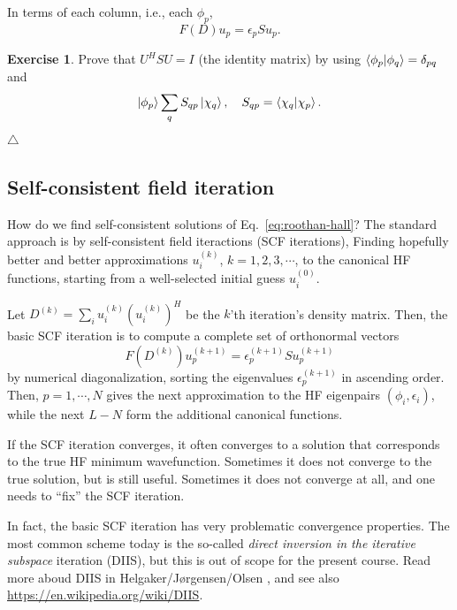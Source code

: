 \documentclass{report}
\theoremstyle{plain}
\theoremstyle{definition}
\newtheorem{exerc}{Exercise}[chapter]
\newcommand\xqed[1]{%
  \leavevmode\unskip\penalty9999 \hbox{}\nobreak\hfill
  \quad\hbox{#1}}
\newcommand\demo{\xqed{$\triangle$}}
\newenvironment{exercise}{\bigskip\begin{exerc}}{\demo\end{exerc}\bigskip}
\begin{document}
In terms of each column, i.e., each $\phi_p$,
\begin{equation}
  F(D) u_p = \epsilon_p S u_p . \label{eq:roothan-hall}
\end{equation}



\begin{exercise}\label{exercise:hf-normalization}
  Prove that $U^HSU=I$ (the identity matrix) by using $\braket{\phi_p|\phi_q} =
  \delta_{pq}$ and
  \begin{equation}
    \ket{\phi_p} \sum_q S_{qp} \ket{\chi_q}, \quad S_{qp} =
    \braket{\chi_q|\chi_p}.
  \end{equation}
\end{exercise}


\subsection{Self-consistent field iteration}

How do we find self-consistent solutions of
Eq.~\eqref{eq:roothan-hall}? The standard approach is by
self-consistent field iteractions (SCF iterations), Finding hopefully
better and better approximations $u_i^{(k)}$, $k=1,2,3,\cdots$, to the
canonical HF functions, starting from a well-selected initial guess
$u_i^{(0)}$.

Let $D^{(k)} = \sum_i u_i^{(k)} (u_i^{(k)})^H$ be the $k$'th
iteration's density matrix. Then, the basic SCF iteration is to
compute a complete set of orthonormal vectors
\begin{equation}
  F(D^{(k)}) u^{(k+1)}_p = \epsilon_p^{(k+1)} S u_p^{(k+1)}
\end{equation}
by numerical diagonalization, sorting the eigenvalues
$\epsilon_{p}^{(k+1)}$ in ascending order. Then, $p=1,\cdots,N$ gives the next
approximation to the HF eigenpairs $(\phi_i,\epsilon_i)$, while the
next $L-N$ form the additional canonical functions.

If the SCF iteration converges, it often converges to a solution that
corresponds to the true HF minimum wavefunction. Sometimes it does not
converge to the true solution, but is still useful. Sometimes it does not
converge at all, and one needs to ``fix'' the SCF iteration. 

In fact, the basic SCF iteration has very problematic convergence
properties.  The most common scheme today is the so-called
\emph{direct inversion in the iterative subspace} iteration (DIIS),
but this is out of scope for the present course. Read more aboud DIIS
in Helgaker/J{\o}rgensen/Olsen \cite{HJO}, and see also \url{https://en.wikipedia.org/wiki/DIIS}.
\end{document}
